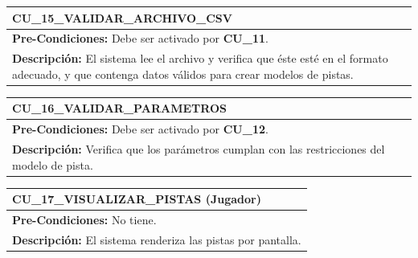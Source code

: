 \begin{center}
  \begin{tabular}{| p{7.5cm} | p{7.5cm} |}
    \hline
    \multicolumn{2}{|p{15cm}|}{\textbf{CU\_15\_VALIDAR\_ARCHIVO\_CSV}} \\ \hline
    \multicolumn{2}{|p{15cm}|}{\textbf{Pre-Condiciones:} Debe ser activado por \textbf{CU\_11}.} \\ \hline
    \multicolumn{2}{|p{15cm}|}{\textbf{Descripción:} El sistema lee el archivo y verifica que éste esté en el formato adecuado, y que contenga datos válidos para crear modelos de pistas.} \\
    \hline
  \end{tabular}
  
  \label{table:usecase:15}
\end{center}

\begin{center}
  \begin{tabular}{| p{7.5cm} | p{7.5cm} |}
    \hline
    \multicolumn{2}{|p{15cm}|}{\textbf{CU\_16\_VALIDAR\_PARAMETROS}} \\ \hline
    \multicolumn{2}{|p{15cm}|}{\textbf{Pre-Condiciones:} Debe ser activado por \textbf{CU\_12}.} \\ \hline
    \multicolumn{2}{|p{15cm}|}{\textbf{Descripción:} Verifica que los parámetros cumplan con las restricciones del modelo de pista.} \\
    \hline
  \end{tabular}
  
  \label{table:usecase:16}
\end{center}

\begin{center}
  \begin{tabular}{| p{7.5cm} | p{7.5cm} |}
    \hline
    \multicolumn{2}{|p{15cm}|}{\textbf{CU\_17\_VISUALIZAR\_PISTAS} (Jugador)} \\ \hline
    \multicolumn{2}{|p{15cm}|}{\textbf{Pre-Condiciones:} No tiene.} \\ \hline
    \multicolumn{2}{|p{15cm}|}{\textbf{Descripción:} El sistema renderiza las pistas por pantalla.} \\
    \hline
  \end{tabular}
  
  \label{table:usecase:17}
\end{center}

